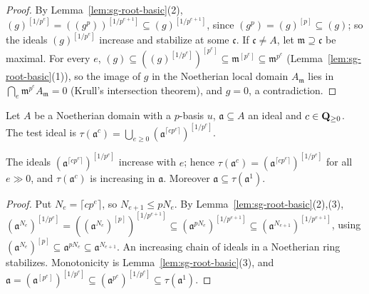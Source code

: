 \begin{proof}
By Lemma~\ref{lem:sg-root-basic}(2), $(g)^{[1/p^e]}=((g^p))^{[1/p^{e+1}]}\subseteq(g)^{[1/p^{e+1}]}$, since $(g^p)=(g)^{[p]}\subseteq(g)$; so the ideals
$(g)^{[1/p^e]}$ increase and stabilize at some $\mathfrak c$. If $\mathfrak c\ne A$, let $\mathfrak m\supseteq\mathfrak c$ be maximal. For every $e$,
$(g)\subseteq((g)^{[1/p^e]})^{[p^e]}\subseteq\mathfrak m^{[p^e]}\subseteq\mathfrak m^{p^e}$ (Lemma~\ref{lem:sg-root-basic}(1)), so the image of $g$ in the Noetherian
local domain $A_{\mathfrak m}$ lies in $\bigcap_e\mathfrak m^{p^e}A_{\mathfrak m}=0$ (Krull's intersection theorem), and $g=0$, a contradiction.
\end{proof}

\begin{definition}\label{def:sg-test-ideal}
\leanok
{}
Let $A$ be a Noetherian domain with a $p$-basis $u$, $\mathfrak a\subseteq A$ an ideal and $c\in\mathbf{Q}_{\ge0}$. The test ideal is
$\tau(\mathfrak a^c)=\bigcup_{e\ge0}(\mathfrak a^{\lceil cp^e\rceil})^{[1/p^e]}$.
\end{definition}

\begin{lemma}\label{lem:sg-test-stable}
\leanok
{}
The ideals $(\mathfrak a^{\lceil cp^e\rceil})^{[1/p^e]}$ increase with $e$; hence $\tau(\mathfrak a^c)=(\mathfrak a^{\lceil cp^e\rceil})^{[1/p^e]}$ for all $e\gg0$, and
$\tau(\mathfrak a^c)$ is increasing in $\mathfrak a$. Moreover $\mathfrak a\subseteq\tau(\mathfrak a^1)$.
\end{lemma}

\begin{proof}
Put $N_e=\lceil cp^e\rceil$, so $N_{e+1}\le pN_e$. By Lemma~\ref{lem:sg-root-basic}(2),(3),
$(\mathfrak a^{N_e})^{[1/p^e]}=((\mathfrak a^{N_e})^{[p]})^{[1/p^{e+1}]}\subseteq(\mathfrak a^{pN_e})^{[1/p^{e+1}]}\subseteq(\mathfrak a^{N_{e+1}})^{[1/p^{e+1}]}$, using
$(\mathfrak a^{N_e})^{[p]}\subseteq\mathfrak a^{pN_e}\subseteq\mathfrak a^{N_{e+1}}$. An increasing chain of ideals in a Noetherian ring stabilizes. Monotonicity is
Lemma~\ref{lem:sg-root-basic}(3), and $\mathfrak a=(\mathfrak a^{[p^e]})^{[1/p^e]}\subseteq(\mathfrak a^{p^e})^{[1/p^e]}\subseteq\tau(\mathfrak a^1)$.
\end{proof}

